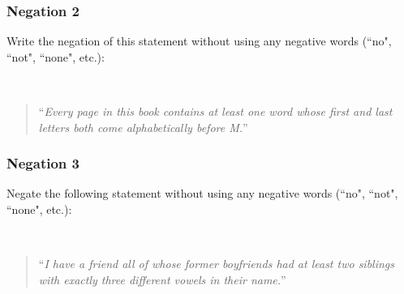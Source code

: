 \documentclass[14pt]{beamer}
\begin{document}
\begin{frame}
\frametitle{Negation 2}

Write the negation of this statement without using any negative words (``no", ``not", ``none", etc.): 

\

	\begin{quote}
		``\emph{Every page in this book contains at least one word whose first and last letters both come alphabetically before M.}''
	\end{quote}
\end{frame}


\begin{frame}
\frametitle{Negation 3}

Negate the following statement without using any negative words (``no", ``not", ``none", etc.): 

\

	\begin{quote}
		``\emph{I have a friend all of whose former boyfriends had at least two siblings 
	    with exactly three different vowels in their name.}''
	\end{quote}
\end{frame}
\end{document}
